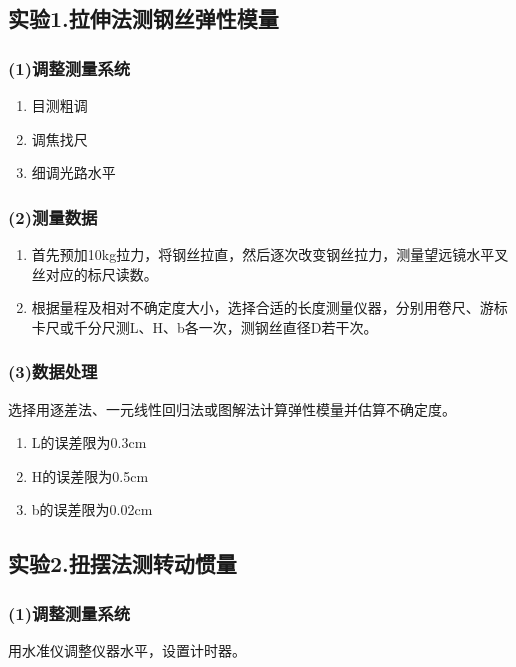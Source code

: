 \documentclass[11pt,a4paper,oneside]{article}
\begin{document}
\subsection*{实验1.拉伸法测钢丝弹性模量}
\subsubsection*{(1)调整测量系统}
\begin{enumerate}
\item 目测粗调
\item 调焦找尺
\item 细调光路水平
\end{enumerate}
\subsubsection*{(2)测量数据}
\begin{enumerate}
\item 首先预加10kg拉力，将钢丝拉直，然后逐次改变钢丝拉力，测量望远镜水平叉丝对应的标尺读数。
\item 根据量程及相对不确定度大小，选择合适的长度测量仪器，分别用卷尺、游标卡尺或千分尺测L、H、b各一次，测钢丝直径D若干次。
\end{enumerate}
\subsubsection*{(3)数据处理}
选择用逐差法、一元线性回归法或图解法计算弹性模量并估算不确定度。
\begin{enumerate}
\item L的误差限为0.3cm
\item H的误差限为0.5cm
\item b的误差限为0.02cm
\end{enumerate}

\subsection*{实验2.扭摆法测转动惯量}
\subsubsection*{(1)调整测量系统}
用水准仪调整仪器水平，设置计时器。
\end{document}
